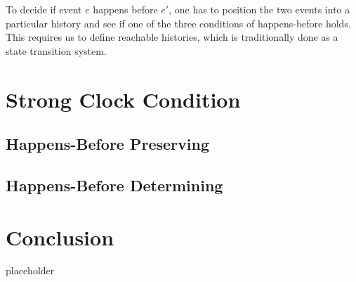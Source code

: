 \documentclass[acmsmall,review,anonymous]{acmart}
\theoremstyle{definition}
\begin{document}
To decide if event $e$ happens before $e'$, one has to position the
two events into a particular history and see if one of the three
conditions of happens-before holds.  This requires us to define
reachable histories, which is traditionally done as a state transition
system.

\section{Strong Clock Condition}

\subsection{Happens-Before Preserving}

\subsection{Happens-Before Determining}

\section{Conclusion}
placeholder~\citep{mattern-vector-time, fidge-vector-time, schmuck-dissertation}


\end{document}
